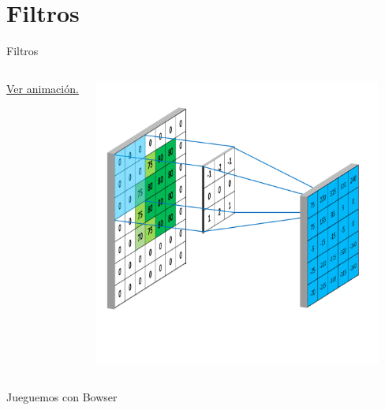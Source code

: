 \section{Filtros}


\begin{frame}{Filtros}

    \vspace*{-2.5cm}
    \begin{columns}
    \column{3cm}
        
        \href{https://mlnotebook.github.io/img/CNN/convSobel.gif}{Ver animación.}
    \column{8cm}
    \begin{center}
        \includegraphics[height=9.5cm]{Figuras/Fig10}
    \end{center}
    \end{columns}
    
\end{frame}

\begin{frame}{Jueguemos con Bowser}
    
    \begin{center}
    \end{center}

\end{frame}



